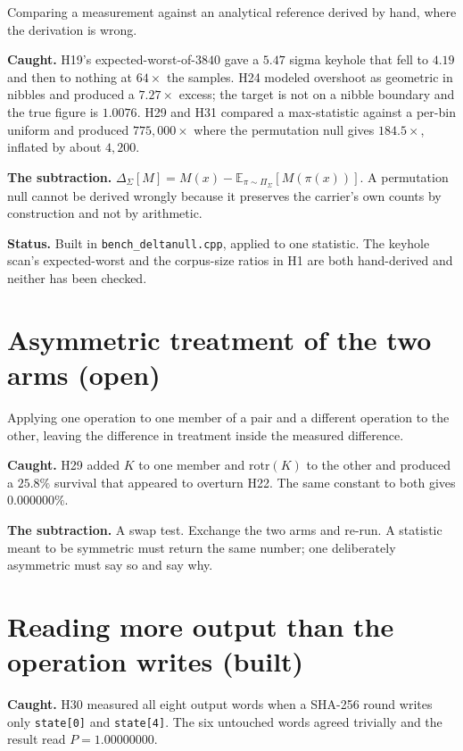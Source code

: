 Comparing a measurement against an analytical reference derived by hand, where the derivation is wrong.

\textbf{Caught.} H19's expected-worst-of-\(3840\) gave a \(5.47\) sigma keyhole that fell to \(4.19\) and then to nothing at \(64\times\) the samples. H24 modeled overshoot as geometric in nibbles and produced a \(7.27\times\) excess; the target is not on a nibble boundary and the true figure is \(1.0076\). H29 and H31 compared a max-statistic against a per-bin uniform and produced \(775{,}000\times\) where the permutation null gives \(184.5\times\), inflated by about \(4{,}200\).

\textbf{The subtraction.} \(\Delta_\Sigma[M] = M(x) - \mathbb{E}_{\pi \sim \Pi_\Sigma}[M(\pi(x))]\). A permutation null cannot be derived wrongly because it preserves the carrier's own counts by construction and not by arithmetic.

\textbf{Status.} Built in \texttt{bench\_deltanull.cpp}, applied to one statistic. The keyhole scan's expected-worst and the corpus-size ratios in H1 are both hand-derived and neither has been checked.

\section{Asymmetric treatment of the two arms (open)}

Applying one operation to one member of a pair and a different operation to the other, leaving the difference in treatment inside the measured difference.

\textbf{Caught.} H29 added \(K\) to one member and \(\mathrm{rotr}(K)\) to the other and produced a \(25.8\%\) survival that appeared to overturn H22. The same constant to both gives \(0.000000\%\).

\textbf{The subtraction.} A swap test. Exchange the two arms and re-run. A statistic meant to be symmetric must return the same number; one deliberately asymmetric must say so and say why.

\section{Reading more output than the operation writes (built)}

\textbf{Caught.} H30 measured all eight output words when a SHA-256 round writes only \texttt{state[0]} and \texttt{state[4]}. The six untouched words agreed trivially and the result read \(P = 1.00000000\).

